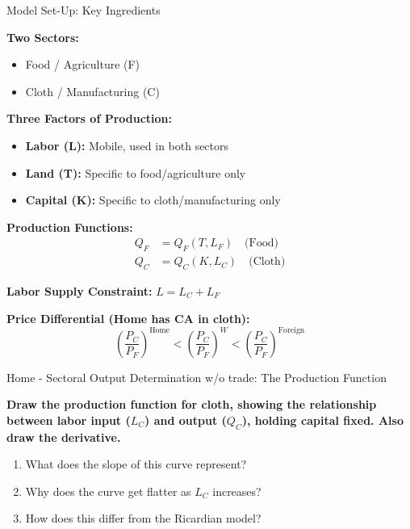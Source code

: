 \documentclass{beamer}
\begin{document}
\begin{frame}{Model Set-Up: Key Ingredients}

\textbf{Two Sectors:}
\begin{itemize}
    \item Food / Agriculture (F)
    \item Cloth / Manufacturing (C)
\end{itemize}

\vspace{0.2cm}

\textbf{Three Factors of Production:}
\begin{itemize}
    \item \textcolor{laborcolor}{\textbf{Labor (L):}} Mobile, used in both sectors
    \item \textcolor{landcolor}{\textbf{Land (T):}} Specific to food/agriculture only
    \item \textcolor{capitalcolor}{\textbf{Capital (K):}} Specific to cloth/manufacturing only
\end{itemize}

\vspace{0.2cm}

\textbf{Production Functions:}
\begin{align*}
Q_F &= Q_F(T, L_F) \quad \text{(Food)} \\
Q_C &= Q_C(K, L_C) \quad \text{(Cloth)}
\end{align*}

\textbf{Labor Supply Constraint:} $L = L_C + L_F$

\vspace{0.2cm}

\textbf{Price Differential (Home has CA in cloth):}
$$\left(\frac{P_C}{P_F}\right)^{\text{Home}} < \left(\frac{P_C}{P_F}\right)^{W} < \left(\frac{P_C}{P_F}\right)^{\text{Foreign}}$$

\end{frame}

\begin{frame}{Home - Sectoral Output Determination w/o trade: The Production Function}

\textbf{Draw the production function for cloth, showing the relationship between labor input ($L_C$) and output ($Q_C$), holding capital fixed. Also draw the derivative.}

\vspace{0.3cm}

\begin{enumerate}
    \item What does the slope of this curve represent?
    \item Why does the curve get flatter as $L_C$ increases?
    \item How does this differ from the Ricardian model?
\end{enumerate}

\end{frame}
\end{document}
